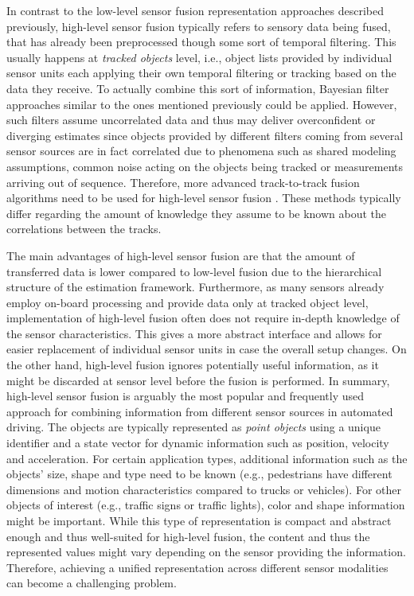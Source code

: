 In contrast to the low-level sensor fusion representation approaches described previously, high-level sensor fusion typically refers to sensory data being fused, that has already been preprocessed though some sort of temporal filtering.
This usually happens at \emph{tracked objects} level, i.e., object lists provided by individual sensor units each applying their own temporal filtering or tracking based on the data they receive.
To actually combine this sort of information, Bayesian filter approaches similar to the ones mentioned previously could be applied. 
However, such filters assume uncorrelated data and thus may deliver overconfident or diverging estimates since objects provided by different filters coming from several sensor sources are in fact correlated due to phenomena such as shared modeling assumptions, common noise acting on the objects being tracked or measurements arriving out of sequence.
Therefore, more advanced track-to-track fusion algorithms need to be used for high-level sensor fusion \parencite{Tian2010, Aeberhard2012}.
These methods typically differ regarding the amount of knowledge they assume to be known about the correlations between the tracks.

The main advantages of high-level sensor fusion are that the amount of transferred data is lower compared to low-level fusion due to the hierarchical structure of the estimation framework.
Furthermore, as many sensors already employ on-board processing and provide data only at tracked object level, implementation of high-level fusion often does not require in-depth knowledge of the sensor characteristics.
This gives a more abstract interface and allows for easier replacement of individual sensor units in case the overall setup changes.
On the other hand, high-level fusion ignores potentially useful information, as it might be discarded at sensor level before the fusion is performed.
In summary, high-level sensor fusion is arguably the most popular and frequently used approach for combining information from different sensor sources in automated driving.
The objects are typically represented as \emph{point objects} using a unique identifier and a state vector for dynamic information such as position, velocity and acceleration.
For certain application types, additional information such as the objects' size, shape and type need to be known (e.g., pedestrians have different dimensions and motion characteristics compared to trucks or vehicles).
For other objects of interest (e.g., traffic signs or traffic lights), color and shape information might be important.
While this type of representation is compact and abstract enough and thus well-suited for high-level fusion, the content and thus the represented values might vary depending on the sensor providing the information.
Therefore, achieving a unified representation across different sensor modalities can become a challenging problem.

